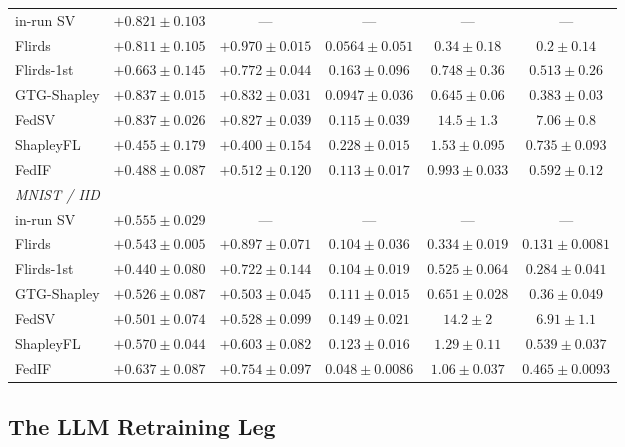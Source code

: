 \documentclass[letterpaper]{article} %
\theoremstyle{plain}
\begin{document}
\begin{table}[t]
\begin{tabular}{lccccc}
in-run SV & $+0.821\pm0.103$ & --- & --- & --- & --- \\
Flirds & $+0.811\pm0.105$ & $+0.970\pm0.015$ & $0.0564\pm0.051$ & $0.34\pm0.18$ & $0.2\pm0.14$ \\
Flirds-1st & $+0.663\pm0.145$ & $+0.772\pm0.044$ & $0.163\pm0.096$ & $0.748\pm0.36$ & $0.513\pm0.26$ \\
GTG-Shapley & $+0.837\pm0.015$ & $+0.832\pm0.031$ & $0.0947\pm0.036$ & $0.645\pm0.06$ & $0.383\pm0.03$ \\
FedSV & $+0.837\pm0.026$ & $+0.827\pm0.039$ & $0.115\pm0.039$ & $14.5\pm1.3$ & $7.06\pm0.8$ \\
ShapleyFL & $+0.455\pm0.179$ & $+0.400\pm0.154$ & $0.228\pm0.015$ & $1.53\pm0.095$ & $0.735\pm0.093$ \\
FedIF & $+0.488\pm0.087$ & $+0.512\pm0.120$ & $0.113\pm0.017$ & $0.993\pm0.033$ & $0.592\pm0.12$ \\
\hline
\multicolumn{6}{l}{\emph{MNIST / IID}} \\
in-run SV & $+0.555\pm0.029$ & --- & --- & --- & --- \\
Flirds & $+0.543\pm0.005$ & $+0.897\pm0.071$ & $0.104\pm0.036$ & $0.334\pm0.019$ & $0.131\pm0.0081$ \\
Flirds-1st & $+0.440\pm0.080$ & $+0.722\pm0.144$ & $0.104\pm0.019$ & $0.525\pm0.064$ & $0.284\pm0.041$ \\
GTG-Shapley & $+0.526\pm0.087$ & $+0.503\pm0.045$ & $0.111\pm0.015$ & $0.651\pm0.028$ & $0.36\pm0.049$ \\
FedSV & $+0.501\pm0.074$ & $+0.528\pm0.099$ & $0.149\pm0.021$ & $14.2\pm2$ & $6.91\pm1.1$ \\
ShapleyFL & $+0.570\pm0.044$ & $+0.603\pm0.082$ & $0.123\pm0.016$ & $1.29\pm0.11$ & $0.539\pm0.037$ \\
FedIF & $+0.637\pm0.087$ & $+0.754\pm0.097$ & $0.048\pm0.0086$ & $1.06\pm0.037$ & $0.465\pm0.0093$ \\
\hline
\end{tabular}
\end{table}

\subsection{The LLM Retraining Leg}
\label{app:llm-fidelity}
\end{document}
